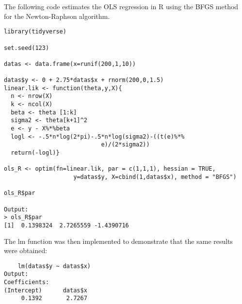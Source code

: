 \documentclass[12pt,letterpaper]{article}
\begin{document}
\item The following code estimates the OLS regression in R using the BFGS method for the Newton-Raphson algorithm.


\begin{verbatim}
library(tidyverse) 

set.seed(123)

datas <- data.frame(x=runif(200,1,10))

datas$y <- 0 + 2.75*datas$x + rnorm(200,0,1.5)
linear.lik <- function(theta,y,X){
  n <- nrow(X)
  k <- ncol(X)
  beta <- theta [1:k]
  sigma2 <- theta[k+1]^2
  e <- y - X%*%beta
  logl <- -.5*n*log(2*pi)-.5*n*log(sigma2)-((t(e)%*%
                            e)/(2*sigma2))
  return(-logl)}

ols_R <- optim(fn=linear.lik, par = c(1,1,1), hessian = TRUE,
                    y=datas$y, X=cbind(1,datas$x), method = "BFGS")

ols_R$par

Output:
> ols_R$par
[1]  0.1398324  2.7265559 -1.4390716

\end{verbatim}
The lm function was then implemented to demonstrate that the same results were obtained:

\begin{verbatim}
    lm(datas$y ~ datas$x)
Output:
Coefficients:
(Intercept)      datas$x  
     0.1392       2.7267
     
\end{verbatim}
\end{document}
